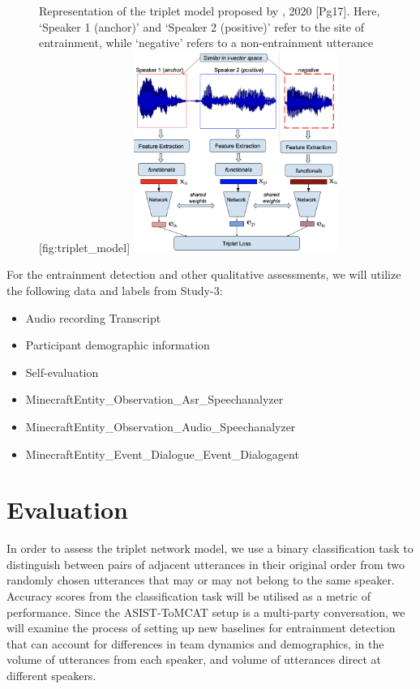 \begin{figure}
    \begin{sidecaption}{%
            Representation of the triplet model proposed by
            \citeauthor{nasir2020}, 2020 [Pg17]. Here, `Speaker 1 (anchor)' and
            `Speaker 2 (positive)' refer to the site of entrainment, while
            `negative' refers to a non-entrainment utterance
    }[fig:triplet_model]
    \centering
    \includegraphics[width=0.6\textwidth]{images/triplet-model.png}
    \end{sidecaption}
\end{figure}

    For the entrainment detection and other qualitative assessments, we will utilize the following data and labels from Study-3:
            \begin{itemize}               
                   \item Audio recording
                    Transcript
                   \item Participant demographic information
                   \item Self-evaluation
                   \item MinecraftEntity\_Observation\_Asr\_Speechanalyzer
                   \item MinecraftEntity\_Observation\_Audio\_Speechanalyzer
                   \item MinecraftEntity\_Event\_Dialogue\_Event\_Dialogagent
            \end{itemize}

\section{Evaluation}

    In order to assess the triplet network model, we use a binary classification task to distinguish between pairs of adjacent utterances in their original order from two randomly chosen utterances that may or may not belong to the same speaker. Accuracy scores from the classification task will be utilised as a metric of performance. Since the ASIST-ToMCAT setup is a multi-party conversation, we will examine the process of setting up new baselines for entrainment detection that can account for differences in team dynamics and demographics, in the volume of utterances from each speaker, and volume of utterances direct at different speakers.

